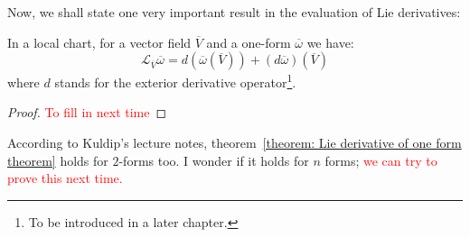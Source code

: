         Now, we shall state one very important result in the evaluation of
        Lie derivatives:
        \begin{theorem}
          \label{theorem: Lie derivative of one form theorem}
          In a local chart, for a vector field $\overline{V}$ and a one-form
          $\overline{\omega}$ we have:
          \begin{equation}
            \mathcal{L}_{\overline{V}}\overline{\omega} =
            d\left(\overline{\omega}(\overline{V})\right) +
            (d\overline{\omega})(\overline{V})
          \end{equation}
          where $d$ stands for the exterior derivative operator\footnote{To
          be introduced in a later chapter.}.
        \end{theorem}
        \begin{proof}
          \textcolor{red}{To fill in next time}
        \end{proof}
        \begin{remark}
          According to Kuldip's lecture notes, theorem~\ref{theorem: Lie
          derivative of one form theorem} holds for $2$-forms too. I wonder
          if it holds for $n$ forms; \textcolor{red}{we can try to prove this
          next time.}
        \end{remark}
